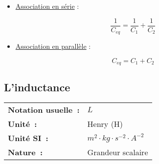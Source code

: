 \begin{itemize}
\item \underline{Association en série} : \\

\begin{center}
\begin{minipage}{.2\textwidth}
\begin{center}

\end{center}
\end{minipage}
\hspace{1cm}
\begin{minipage}{.3\textwidth} 
\begin{equation}
	\dfrac{1}{C_{eq}} = \dfrac{1}{C_1} + \dfrac{1}{C_2}
\end{equation}
\end{minipage}
\end{center}

\vspace{0.5cm}

\item \underline{Association en parallèle} : \\

\begin{center}
\begin{minipage}{.2\textwidth}
\begin{center}
	
\end{center}
\end{minipage}
\hspace{1cm}
\begin{minipage}{.3\textwidth} 
\begin{equation}
	C_{eq} = C_1 + C_2
\end{equation}
\end{minipage}
\end{center}
\end{itemize}


\subsection{ L'inductance }

\vspace{0.5cm}
\begin{tabular}{ll}
\textbf{Notation usuelle~:} & $L$ \\
\textbf{Unité~:} & Henry (H) \\
	\textbf{Unité SI~:} & $m^2 \cdot kg \cdot {s}^{-2} \cdot A^{-2}$ \\
\textbf{Nature~:} & Grandeur scalaire \\
\end{tabular} 

